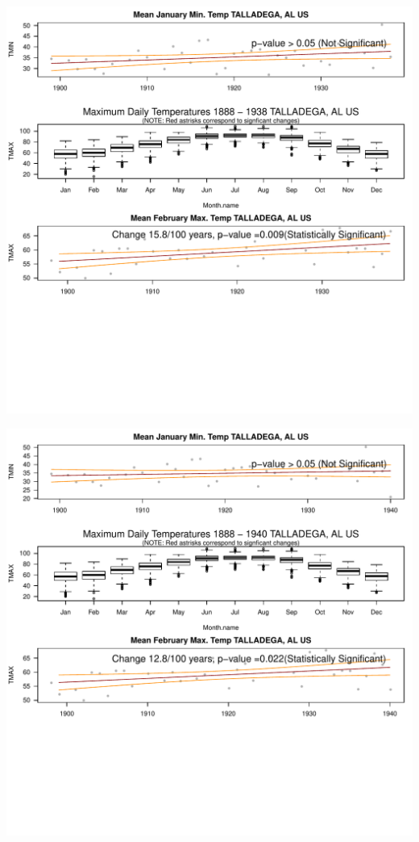 \documentclass{article}\usepackage[]{graphicx}\usepackage[]{color}
\makeatletter
\def\maxwidth{ %
  \ifdim\Gin@nat@width>\linewidth
    \linewidth
  \else
    \Gin@nat@width
  \fi
}
\newenvironment{knitrout}{}{} %
\makeatother
\begin{document}
\begin{knitrout}
\includegraphics[width=\maxwidth]{figure/static_template-15} 

\includegraphics[width=\maxwidth]{figure/static_template-16} 


\end{knitrout}
\end{document}
